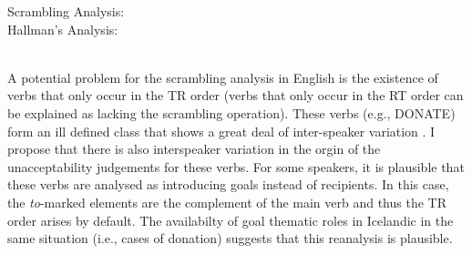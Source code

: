 \begin{exe}
\ex \label{ex:comparison-trees}
\begin{xlist}
\ex Scrambling Analysis: \\
 \ex\label{ex:hallman-tree} Hallman's Analysis: \\
\\
\end{xlist}
\end{exe}%

A potential problem for the scrambling analysis in English is the existence of verbs that only occur in the TR order (verbs that only occur in the RT order can be explained as lacking the scrambling operation). These verbs (e.g., DONATE) form an ill defined class that shows a great deal of inter-speaker variation \citep{Levin.1993}. I propose that there is also interspeaker variation in the orgin of the unacceptability judgements for these verbs. For some speakers, it is plausible that these verbs are analysed as introducing goals instead of recipients. In this case, the \textit{to}-marked elements are the complement of the main verb and thus the TR order arises by default. The availabilty of goal thematic roles in Icelandic in the same situation (i.e., cases of donation) suggests that this reanalysis is plausible.

